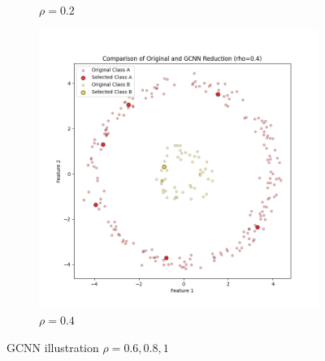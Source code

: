 \begin{figure}[htbp]
\begin{subfigure}[b]{0.3\textwidth}
		\caption{$\rho = 0.2$}
		\label{fig:rho0.2}
	\end{subfigure}
	\hfill
	\begin{subfigure}[b]{0.3\textwidth}
		\centering		\includegraphics[width=\textwidth]{figures/gcnn/comparison_plot_rho_0.4.png}
		\caption{$\rho = 0.4$}
		\label{fig:rho0.4}
	\end{subfigure}
	\caption{GCNN illustration $\rho=0.6,0.8,1$}
	\label{fig:rho_variation_1}
\end{figure}

